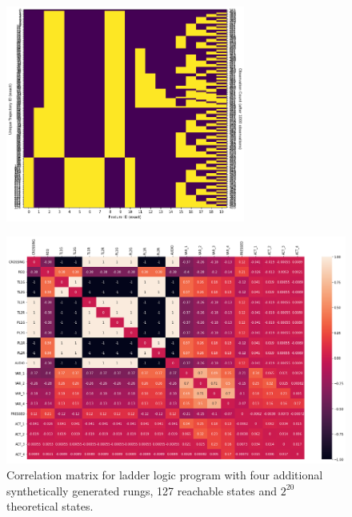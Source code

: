 \documentclass[runningheads]{llncs}
\begin{document}
\begin{figure}
	\centering
	\includegraphics[width=0.7\textwidth]{figs/p4_states.png}
\end{figure}

\begin{figure}[!t]
	\label{fig:heatmap}
	\centering
	\includegraphics[width=\columnwidth]{figs/heatmap.png}
	\caption{Correlation matrix for ladder logic program with four additional synthetically generated rungs, 127 reachable states and $2^{20}$ theoretical states.}
\end{figure}

\end{document}
